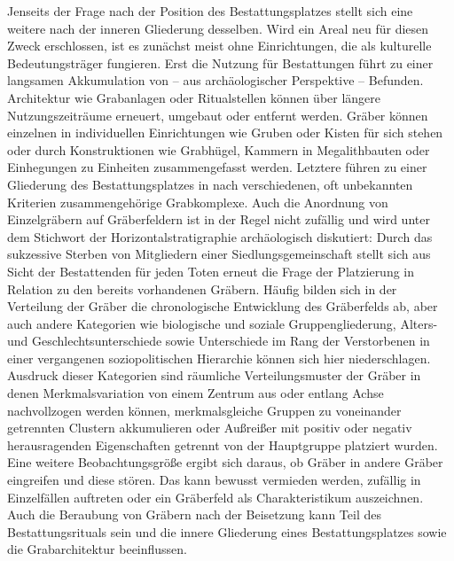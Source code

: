 \documentclass[openany,twoside,twocolumn]{book}
\begin{document}
Jenseits der Frage nach der Position des Bestattungsplatzes stellt sich
eine weitere nach der inneren Gliederung desselben. Wird ein Areal neu
für diesen Zweck erschlossen, ist es zunächst meist ohne Einrichtungen,
die als kulturelle Bedeutungsträger fungieren. Erst die Nutzung für
Bestattungen führt zu einer langsamen Akkumulation von -- aus
archäologischer Perspektive -- Befunden. Architektur wie Grabanlagen
oder Ritualstellen können über längere Nutzungszeiträume erneuert,
umgebaut oder entfernt werden. Gräber können einzelnen in individuellen
Einrichtungen wie Gruben oder Kisten für sich stehen oder durch
Konstruktionen wie Grabhügel, Kammern in Megalithbauten oder Einhegungen
zu Einheiten zusammengefasst werden. Letztere führen zu einer Gliederung
des Bestattungsplatzes in nach verschiedenen, oft unbekannten Kriterien
zusammengehörige Grabkomplexe. Auch die Anordnung von Einzelgräbern auf
Gräberfeldern ist in der Regel nicht zufällig und wird unter dem
Stichwort der Horizontalstratigraphie archäologisch diskutiert: Durch
das sukzessive Sterben von Mitgliedern einer Siedlungsgemeinschaft
stellt sich aus Sicht der Bestattenden für jeden Toten erneut die Frage
der Platzierung in Relation zu den bereits vorhandenen Gräbern. Häufig
bilden sich in der Verteilung der Gräber die chronologische Entwicklung
des Gräberfelds ab, aber auch andere Kategorien wie biologische und
soziale Gruppengliederung, Alters- und Geschlechtsunterschiede sowie
Unterschiede im Rang der Verstorbenen in einer vergangenen
soziopolitischen Hierarchie können sich hier niederschlagen. Ausdruck
dieser Kategorien sind räumliche Verteilungsmuster der Gräber in denen
Merkmalsvariation von einem Zentrum aus oder entlang Achse nachvollzogen
werden können, merkmalsgleiche Gruppen zu voneinander getrennten
Clustern akkumulieren oder Außreißer mit positiv oder negativ
herausragenden Eigenschaften getrennt von der Hauptgruppe platziert
wurden. Eine weitere Beobachtungsgröße ergibt sich daraus, ob Gräber in
andere Gräber eingreifen und diese stören. Das kann bewusst vermieden
werden, zufällig in Einzelfällen auftreten oder ein Gräberfeld als
Charakteristikum auszeichnen. Auch die Beraubung von Gräbern nach der
Beisetzung kann Teil des Bestattungsrituals sein und die innere
Gliederung eines Bestattungsplatzes sowie die Grabarchitektur
beeinflussen.
\end{document}
